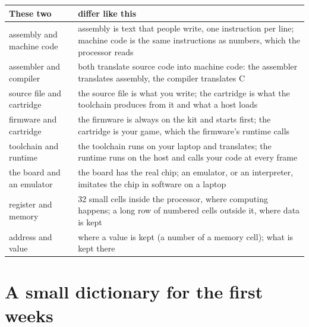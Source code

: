 \begin{center}\small
\begin{tabularx}{\textwidth}{@{}lL@{}}
\toprule
\textbf{These two} & \textbf{differ like this}\\
\midrule
assembly and machine code & assembly is text that people write, one instruction per line; machine code is the same instructions as numbers, which the processor reads\\
assembler and compiler & both translate source code into machine code: the assembler translates assembly, the compiler translates C\\
source file and cartridge & the source file is what you write; the cartridge is what the toolchain produces from it and what a host loads\\
firmware and cartridge & the firmware is always on the kit and starts first; the cartridge is your game, which the firmware's runtime calls\\
toolchain and runtime & the toolchain runs on your laptop and translates; the runtime runs on the host and calls your code at every frame\\
the board and an emulator & the board has the real chip; an emulator, or an interpreter, imitates the chip in software on a laptop\\
register and memory & 32 small cells inside the processor, where computing happens; a long row of numbered cells outside it, where data is kept\\
address and value & where a value is kept (a number of a memory cell); what is kept there\\
\bottomrule
\end{tabularx}
\end{center}

\section*{A small dictionary for the first weeks}

